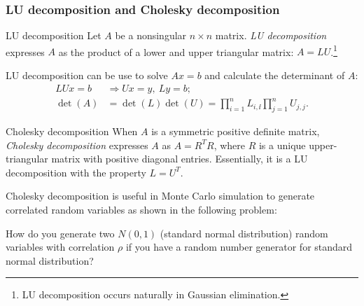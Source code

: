 \subsubsection{LU decomposition and Cholesky decomposition}

\begin{concept}{LU decomposition}
Let \(A\) be a nonsingular \(n\times n\) matrix. \emph{LU decomposition} expresses \(A\) as the product of a lower and upper triangular matrix: \(A=LU\).\footnote[17]{LU decomposition occurs naturally in Gaussian elimination.}

LU decomposition can be use to solve \(Ax=b\) and calculate the determinant of \(A\):
\[
\begin{aligned}
LUx=b&\Rightarrow Ux=y,\ Ly=b;\\
\det(A)&=\det(L)\det(U)=\prod_{i=1}^{n}L_{i,\ii}\prod_{j=1}^{n}U_{j,j}.
\end{aligned}
\]
\end{concept}

\begin{concept}{Cholesky decomposition}
When \(A\) is a symmetric positive definite matrix, \emph{Cholesky decomposition} expresses \(A\) as \(A=R^T R\), where \(R\) is a unique upper-triangular matrix with positive diagonal entries. Essentially, it is a LU decomposition with the property \(L=U^T\).
\end{concept}

Cholesky decomposition is useful in Monte Carlo simulation to generate correlated random variables as shown in the following problem:

\begin{problem}{How do you generate two \(N(0,1)\) (standard normal distribution) random variables with correlation \(\rho\) if you have a random number generator for standard normal distribution?}
\end{problem}


